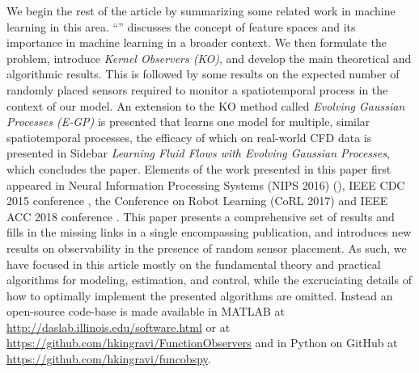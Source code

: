  We begin the rest of the article by summarizing some related work in machine learning in this area.  ``'' discusses the concept of feature spaces and its importance in machine learning in a broader context. We then formulate the problem, introduce \emph{Kernel Observers (KO)}, and develop the main theoretical and algorithmic results.
This is followed by some results on the expected number of randomly placed sensors required to monitor a spatiotemporal process in the context of our model. An extension to the KO method called \emph{Evolving Gaussian Processes (E-GP)} is presented that learns one model for multiple, similar spatiotemporal processes, the efficacy of which on real-world CFD data is presented in Sidebar \emph{Learning Fluid Flows with Evolving Gaussian Processes}, which concludes the paper. 
Elements of the work presented in this paper first appeared in Neural Information Processing Systems (NIPS 2016) (\cite{Kingravi16_NIPS,whitman2016NIPSworkshop}), IEEE CDC 2015 conference \cite{Kingravi:2015a}, the Conference on Robot Learning (CoRL 2017) \cite{whitman2017learning} and IEEE ACC 2018 conference \cite{Maske18_ACC}.  This paper presents a comprehensive set of results and fills in the missing links in a single encompassing publication, and introduces new results on observability in the presence of random sensor placement. As such, we have focused in this article mostly on the fundamental theory and practical algorithms for modeling, estimation, and control, while the excruciating details of how to optimally implement the presented algorithms are omitted. Instead an open-source code-base is made available in MATLAB at \url{http://daslab.illinois.edu/software.html} or at \url{https://github.com/hkingravi/FunctionObservers} and in Python on GitHub at \url{https://github.com/hkingravi/funcobspy}. 

